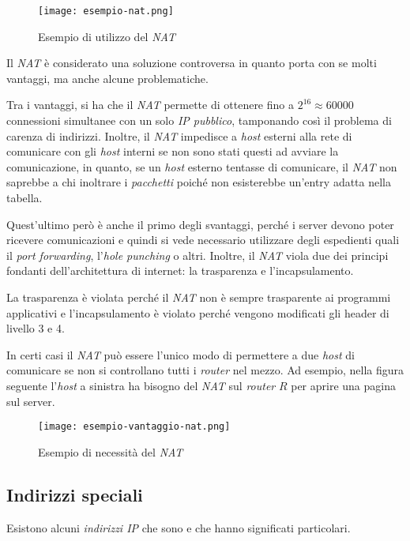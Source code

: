 \begin{figure}[ht]
    \centering
    \texttt{[image: esempio-nat.png]}
    \caption{Esempio di utilizzo del \emph{NAT}}
\end{figure}
\newpage\noindent
Il \emph{NAT} è considerato una soluzione controversa in quanto porta con
se molti vantaggi, ma anche alcune problematiche.

Tra i vantaggi, si ha che il \emph{NAT} permette di ottenere fino a
$2^{16}\approx60000$ connessioni simultanee con un solo \emph{IP pubblico},
tamponando così il problema di carenza di indirizzi. Inoltre, il \emph{NAT}
impedisce a \emph{host} esterni alla rete di comunicare con gli \emph{host}
interni se non sono stati questi ad avviare la comunicazione, in quanto, se un
\emph{host} esterno tentasse di comunicare, il \emph{NAT} non saprebbe a chi
inoltrare i \emph{pacchetti} poiché non esisterebbe un'entry adatta nella tabella.

Quest'ultimo però è anche il primo degli svantaggi, perché i server devono poter
ricevere comunicazioni e quindi si vede necessario utilizzare degli espedienti
quali il \emph{port forwarding}, l'\emph{hole punching} o altri. Inoltre, il
\emph{NAT} viola due dei principi fondanti dell'architettura di internet: la
trasparenza e l'incapsulamento.

La trasparenza è violata perché il \emph{NAT} non è sempre trasparente ai
programmi applicativi e l'incapsulamento è violato perché vengono modificati gli
header di livello 3 e 4.

\begin{note}
    In certi casi il \emph{NAT} può essere l'unico modo di permettere a due
    \emph{host} di comunicare se non si controllano tutti i \emph{router} nel
    mezzo. Ad esempio, nella figura seguente l'\emph{host} a sinistra ha bisogno
    del \emph{NAT} sul \emph{router} $R$ per aprire una pagina sul server.

    \begin{figure}[h!]
        \centering
        \texttt{[image: esempio-vantaggio-nat.png]}
        \caption{Esempio di necessità del \emph{NAT}}
    \end{figure}
\end{note}

\subsection{Indirizzi speciali}
Esistono alcuni \emph{indirizzi IP} che sono  e che hanno
significati particolari.

